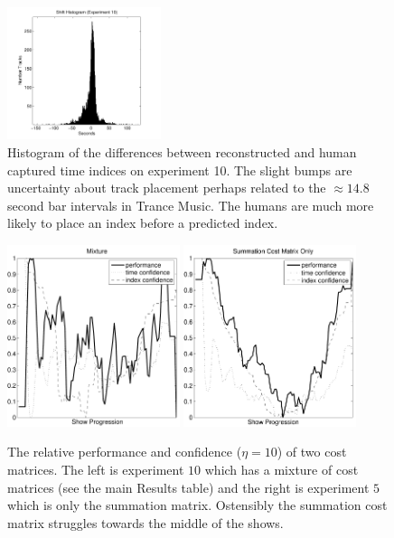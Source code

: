 \documentclass[twocolumn]{article}
\begin{document}
	\begin{figure}
		\centering
		\includegraphics[width=0.4\textwidth]{images/shift_histogram}
		\caption{Histogram of the differences between reconstructed and human captured time indices on experiment 10. The slight bumps are uncertainty about track placement perhaps related to the $\approx 14.8$ second bar intervals in Trance Music. The humans are much more likely to place an index before a predicted index.  }
		\label{fig:shifthistogram}
	\end{figure} 

	\begin{figure}[t]
		\centering
		\includegraphics[width=0.45\textwidth]{images/confs_mix}
		\includegraphics[width=0.45\textwidth]{images/confs_sum}
		\caption{The relative performance and confidence ($\eta=10$) of two cost matrices. The left is experiment $10$ which has a mixture of cost matrices (see the main Results table) and the right is experiment $5$ which is only the summation matrix. Ostensibly the summation cost matrix struggles towards the middle of the shows.}
		\label{fig:overallconfs}
	\end{figure} 
\end{document}
